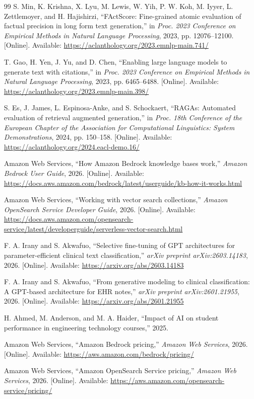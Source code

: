 \begin{thebibliography}{99}
S. Min, K. Krishna, X. Lyu, M. Lewis, W. Yih, P. W. Koh, M. Iyyer, L. Zettlemoyer, and H. Hajishirzi,
``FActScore: Fine-grained atomic evaluation of factual precision in long form text generation,''
in \textit{Proc. 2023 Conference on Empirical Methods in Natural Language Processing}, 2023, pp. 12076--12100.
[Online]. Available: \url{https://aclanthology.org/2023.emnlp-main.741/}

T. Gao, H. Yen, J. Yu, and D. Chen,
``Enabling large language models to generate text with citations,''
in \textit{Proc. 2023 Conference on Empirical Methods in Natural Language Processing}, 2023, pp. 6465--6488.
[Online]. Available: \url{https://aclanthology.org/2023.emnlp-main.398/}

S. Es, J. James, L. Espinosa-Anke, and S. Schockaert,
``RAGAs: Automated evaluation of retrieval augmented generation,''
in \textit{Proc. 18th Conference of the European Chapter of the Association for Computational Linguistics: System Demonstrations}, 2024, pp. 150--158.
[Online]. Available: \url{https://aclanthology.org/2024.eacl-demo.16/}



Amazon Web Services,
``How Amazon Bedrock knowledge bases work,''
\textit{Amazon Bedrock User Guide}, 2026.
[Online]. Available: \url{https://docs.aws.amazon.com/bedrock/latest/userguide/kb-how-it-works.html}

Amazon Web Services,
``Working with vector search collections,''
\textit{Amazon OpenSearch Service Developer Guide}, 2026.
[Online]. Available: \url{https://docs.aws.amazon.com/opensearch-service/latest/developerguide/serverless-vector-search.html}

F. A. Irany and S. Akwafuo,
``Selective fine-tuning of GPT architectures for parameter-efficient clinical text classification,''
\textit{arXiv preprint arXiv:2603.14183}, 2026.
[Online]. Available: \url{https://arxiv.org/abs/2603.14183}

F. A. Irany and S. Akwafuo,
``From generative modeling to clinical classification: A GPT-based architecture for EHR notes,''
\textit{arXiv preprint arXiv:2601.21955}, 2026.
[Online]. Available: \url{https://arxiv.org/abs/2601.21955}

H. Ahmed, M. Anderson, and M. A. Haider,
``Impact of AI on student performance in engineering technology courses,''
2025.


Amazon Web Services,
``Amazon Bedrock pricing,''
\textit{Amazon Web Services}, 2026.
[Online]. Available: \url{https://aws.amazon.com/bedrock/pricing/}

Amazon Web Services,
``Amazon OpenSearch Service pricing,''
\textit{Amazon Web Services}, 2026.
[Online]. Available: \url{https://aws.amazon.com/opensearch-service/pricing/}

\end{thebibliography}